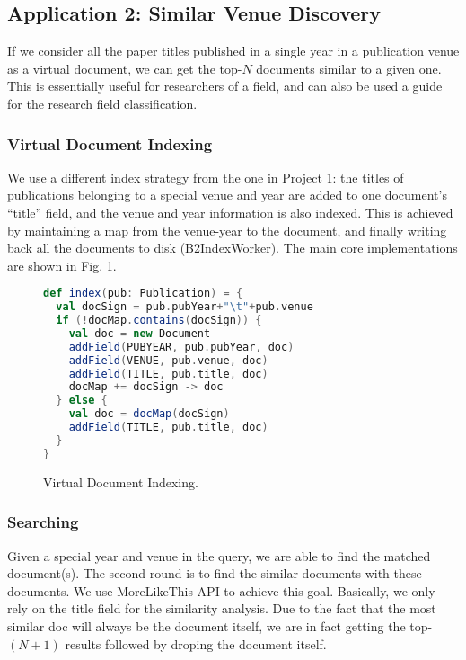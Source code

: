 \subsection{Application 2: Similar Venue Discovery}

If we consider all the paper titles published in a single year in a publication venue as a virtual document, we can get the top-$N$ documents similar to a given one. This is essentially useful for researchers of a field, and can also be used a guide for the research field classification.

\subsubsection{Virtual Document Indexing}
We use a different index strategy from the one in Project 1: the titles of publications belonging to a special venue and year are added to one document's ``title'' field,  and the venue and year information is also indexed. This is achieved by maintaining a map from the venue-year to the document, and finally writing back all the documents to disk (\textsf{B2IndexWorker}). The main core implementations are shown in Fig. \ref{fig:a2index}.

\begin{figure}[t]
\begin{lstlisting}[language=scala]
def index(pub: Publication) = {
  val docSign = pub.pubYear+"\t"+pub.venue
  if (!docMap.contains(docSign)) {
    val doc = new Document
    addField(PUBYEAR, pub.pubYear, doc)
    addField(VENUE, pub.venue, doc)
    addField(TITLE, pub.title, doc)
    docMap += docSign -> doc
  } else {
    val doc = docMap(docSign)
    addField(TITLE, pub.title, doc)
  }
}	
\end{lstlisting}
\caption{Virtual Document Indexing.}\label{fig:a2index}
\end{figure}

\subsubsection{Searching}
Given a special \textsf{year} and \textsf{venue} in the query, we are able to find the matched document(s). The second round is to find the similar documents with these documents. We use \textsf{MoreLikeThis} API to achieve this goal. Basically, we only rely on the \textsf{title} field for the similarity analysis. Due to the fact that the most similar doc will always be the document itself, we are in fact getting the top-$(N+1)$ results followed by droping the document itself.


